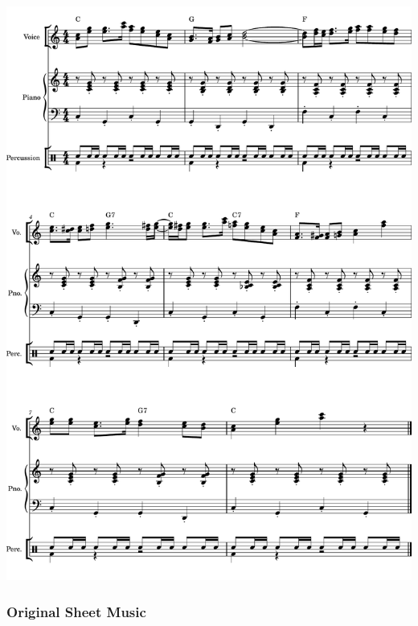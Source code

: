 \begin{center}
	\includegraphics[width=6in]{appendices/piranha_generated.pdf}
\end{center}

\clearpage
\subsubsection{Original Sheet Music}
\label{sec:sheet_music_original}

